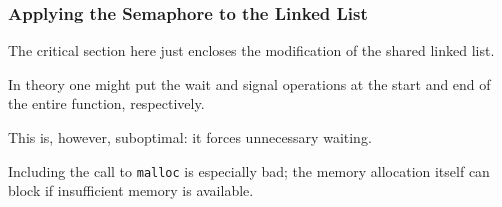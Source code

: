 \begin{frame}
	\frametitle{Applying the Semaphore to the Linked List}

	The critical section here just encloses the modification of the shared linked list.

	In theory one might put the wait and signal operations at the start and end of the entire function, respectively.

	This is, however, suboptimal: it forces unnecessary waiting.

	Including the call to \texttt{malloc} is especially bad; the memory allocation itself can block if insufficient memory is available.

\end{frame}



